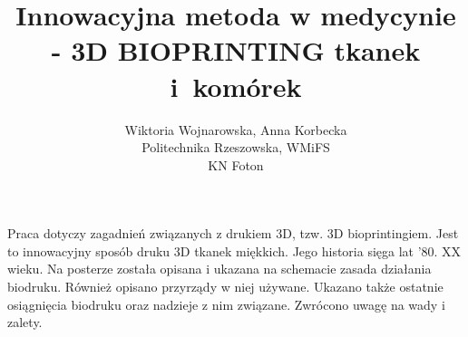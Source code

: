 \documentclass[12pt, a4paper]{article}
\begin{document}
\title{Innowacyjna metoda w medycynie - 3D BIOPRINTING tkanek i~komórek}
\author{Wiktoria Wojnarowska, Anna Korbecka \\Politechnika Rzeszowska, WMiFS \\KN Foton}
\date {}
\maketitle
\thispagestyle{title}
Praca dotyczy zagadnień związanych z drukiem 3D, tzw. 3D bioprintingiem. Jest to innowacyjny sposób druku 3D tkanek miękkich. Jego historia sięga lat ’80. XX  wieku. Na posterze została opisana i ukazana na schemacie zasada działania biodruku. Również opisano przyrządy w niej używane. Ukazano także ostatnie osiągnięcia biodruku oraz nadzieje z nim związane. Zwrócono uwagę na wady i zalety. 
\end{document}
